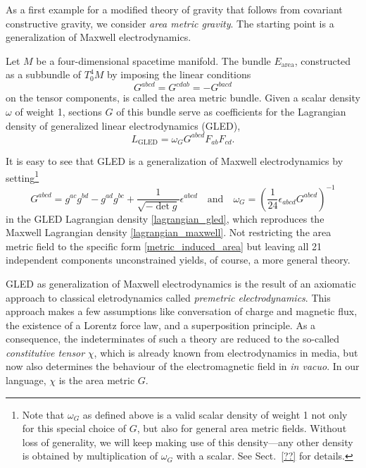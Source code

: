 As a first example for a modified theory of gravity that follows from covariant constructive gravity, we consider \emph{area metric gravity}. The starting point is a generalization of Maxwell electrodynamics.
\begin{definition}
  Let $M$ be a four-dimensional spacetime manifold. The bundle $E_\text{area}$, constructed as a subbundle of $T^4_0M$ by imposing the linear conditions
  \begin{equation}
    G^{abcd} = G^{cdab} = -G^{bacd}
  \end{equation}
  on the tensor components, is called the area metric bundle. Given a scalar density $\omega$ of weight 1, sections $G$ of this bundle serve as coefficients for the Lagrangian density of generalized linear electrodynamics (GLED),
  \begin{equation}\label{lagrangian_gled}
    L_\text{GLED} = \omega_G G^{abcd} F_{ab} F_{cd}.
  \end{equation}
\end{definition}
It is easy to see that GLED is a generalization of Maxwell electrodynamics by setting\footnote{Note that $\omega_G$ as defined above is a valid scalar density of weight 1 not only for this special choice of $G$, but also for general area metric fields. Without loss of generality, we will keep making use of this density---any other density is obtained by multiplication of $\omega_G$ with a scalar. See Sect.~\ref{??} for details.}
\begin{equation}\label{metric_induced_area}
  G^{abcd} = g^{ac} g^{bd} - g^{ad} g^{bc} + \frac{1}{\sqrt{-\operatorname{det}g}} \epsilon^{abcd}\quad\text{and}\quad \omega_G = \left(\frac{1}{24}\epsilon_{abcd}G^{abcd}\right)^{-1}
\end{equation}
in the GLED Lagrangian density \eqref{lagrangian_gled}, which reproduces the Maxwell Lagrangian density \eqref{lagrangian_maxwell}. Not restricting the area metric field to the specific form \eqref{metric_induced_area} but leaving all 21 independent components unconstrained yields, of course, a more general theory.

GLED as generalization of Maxwell electrodynamics is the result of an axiomatic approach to classical eletrodynamics called \emph{premetric electrodynamics}\cite{hehl}. This approach makes a few assumptions like conversation of charge and magnetic flux, the existence of a Lorentz force law, and a superposition principle. As a consequence, the indeterminates of such a theory are reduced to the so-called \emph{constitutive tensor} $\chi$, which is already known from electrodynamics in media, but now also determines the behaviour of the electromagnetic field in \emph{in vacuo}. In our language, $\chi$ is the area metric $G$.

